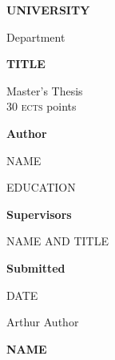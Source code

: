 \documentclass[a4paper]{article}
\newlength{\drop}%
\begin{document}
	\begin{titlepage}
		\setlength{\parindent}{0pt}
\selectfont
	\textheight
	\vspace*{0.5\drop}
	\centering
	{\huge\sffamily\bfseries
		UNIVERSITY \par
	\Large\sffamily\mdseries Department\par}
	\vspace{2\baselineskip}
	{\LARGE\sffamily\bfseries TITLE\par}
	\vfill
	{\Large Master's Thesis\\ 30 \textsc{ects} points\par}
	\vfill
	{\large \textbf{Author}\par
	NAME\par
	EDUCATION\par
	\textbf{Supervisors}\par
	NAME AND TITLE\par
	\textbf{Submitted}\par
DATE\par}

\vspace{\drop}

{\color{gray!50}\fontsize{40pt}{56pt} Arthur Author\par}
\vspace{-.7\baselineskip}
	{\large\normalfont\bfseries NAME\par}
\end{titlepage}
\end{document}
